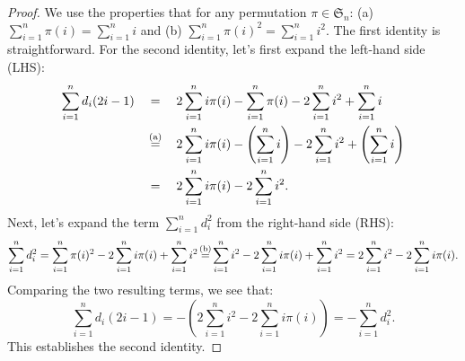 \documentclass{article}
\theoremstyle{definition}
\newcommand\stackrelmt[2]{\stackrel{\mathclap{\text{#1}}}{#2}}
\begin{document}
\begin{proof}
    We use the properties that for any permutation $\pi \in \mathfrak{S}_n$:
    (a) $\sum_{i=1}^{n} \pi(i) = \sum_{i=1}^{n} i$ and (b) $\sum_{i=1}^{n} \pi(i)^2 = \sum_{i=1}^{n} i^2$.
    The first identity is straightforward.
    For the second identity, let's first expand the left-hand side (LHS):
    \begin{align*}
        \sum_{i=1}^{n} d_i(2i-1)
        \quad&=\quad2\sum_{i=1}^{n} i\pi(i) - \sum_{i=1}^{n} \pi(i) - 2\sum_{i=1}^{n} i^2 + \sum_{i=1}^{n} i \\
        &\stackrelmt{(a)}{=} \quad2\sum_{i=1}^{n} i\pi(i) - \left(\sum_{i=1}^{n} i\right) - 2\sum_{i=1}^{n} i^2 + \left(\sum_{i=1}^{n} i\right) \\
        &= \quad2\sum_{i=1}^{n} i\pi(i) - 2\sum_{i=1}^{n} i^2
    .\end{align*}
    Next, let's expand the term $\sum_{i=1}^{n} d_i^2$ from the right-hand side (RHS):
    \begin{align*}
        \sum_{i=1}^{n} d_i^2
        = \sum_{i=1}^{n} \pi(i)^2 - 2\sum_{i=1}^{n} i\pi(i) + \sum_{i=1}^{n} i^2
        \stackrelmt{(b)}{=} \sum_{i=1}^{n} i^2 - 2\sum_{i=1}^{n} i\pi(i) + \sum_{i=1}^{n} i^2
        = 2\sum_{i=1}^{n} i^2 - 2\sum_{i=1}^{n} i\pi(i)
    .\end{align*}
    Comparing the two resulting terms, we see that:
    \[
        \sum_{i=1}^{n} d_i(2i-1) 
        = - \left( 2\sum_{i=1}^{n} i^2 - 2\sum_{i=1}^{n} i\pi(i) \right) 
        = -\sum_{i=1}^{n} d_i^2.
    \]
    This establishes the second identity.
\end{proof}
\end{document}
